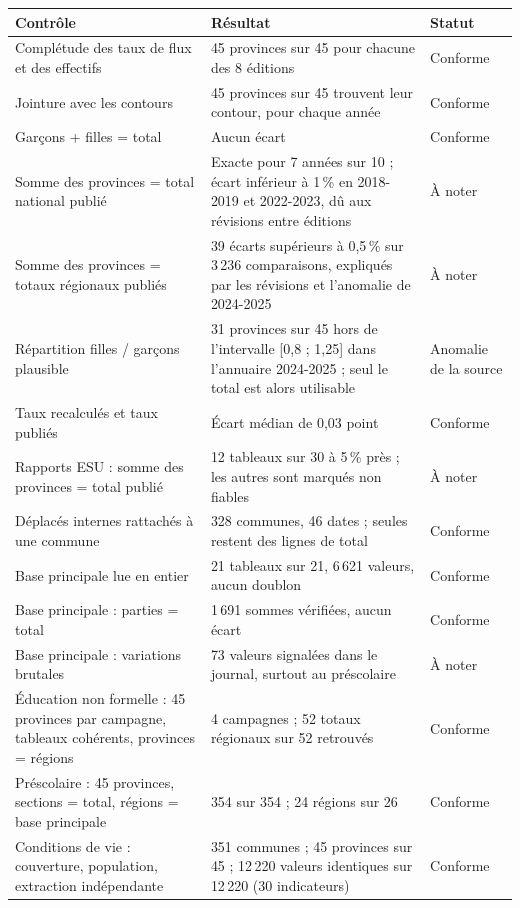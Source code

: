 \documentclass{article}
\begin{document}
\begin{table}[!t]
\centering
\small
\begin{tabularx}{\textwidth}{@{}L{5.2cm} Y L{1.6cm}@{}}
\toprule
Contrôle & Résultat & Statut \\
\midrule
Complétude des taux de flux et des effectifs & 45 provinces sur 45 pour chacune des 8 éditions & Conforme \\
Jointure avec les contours & 45 provinces sur 45 trouvent leur contour, pour chaque année & Conforme \\
Garçons + filles = total & Aucun écart & Conforme \\
Somme des provinces = total national publié & Exacte pour 7 années sur 10 ; écart inférieur à 1\,\% en 2018-2019 et 2022-2023, dû aux révisions entre éditions & À noter \\
Somme des provinces = totaux régionaux publiés & 39 écarts supérieurs à 0,5\,\% sur 3\,236 comparaisons, expliqués par les révisions et l'anomalie de 2024-2025 & À noter \\
Répartition filles / garçons plausible & 31 provinces sur 45 hors de l'intervalle [0,8 ; 1,25] dans l'annuaire 2024-2025 ; seul le total est alors utilisable & Anomalie de la source \\
Taux recalculés et taux publiés & Écart médian de 0,03 point & Conforme \\
Rapports ESU : somme des provinces = total publié & 12 tableaux sur 30 à 5\,\% près ; les autres sont marqués non fiables & À noter \\
Déplacés internes rattachés à une commune & 328 communes, 46 dates ; seules restent des lignes de total & Conforme \\
Base principale lue en entier & 21 tableaux sur 21, 6\,621 valeurs, aucun doublon & Conforme \\
Base principale : parties = total & 1\,691 sommes vérifiées, aucun écart & Conforme \\
Base principale : variations brutales & 73 valeurs signalées dans le journal, surtout au préscolaire & À noter \\
Éducation non formelle : 45 provinces par campagne, tableaux cohérents, provinces = régions & 4 campagnes ; 52 totaux régionaux sur 52 retrouvés & Conforme \\
Préscolaire : 45 provinces, sections = total, régions = base principale & 354 sur 354 ; 24 régions sur 26 & Conforme \\
Conditions de vie : couverture, population, extraction indépendante & 351 communes ; 45 provinces sur 45 ; 12\,220 valeurs identiques sur 12\,220 (30 indicateurs) & Conforme \\

\end{tabularx}
\end{table}
\end{document}

